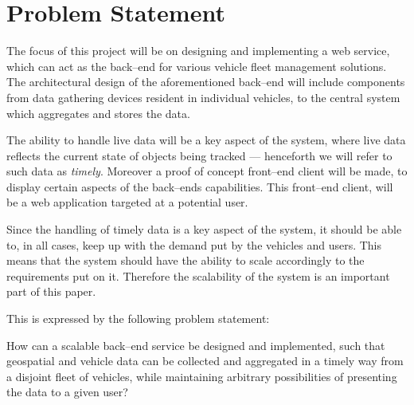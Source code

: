 \section{Problem Statement}\label{sec:problem_statement}

The focus of this project will be on designing and implementing a web service,
which can act as the back--end for various vehicle fleet management solutions.
The architectural design of the aforementioned back--end will include components
from data gathering devices resident in individual vehicles,
to the central system which aggregates and stores the data.

The ability to handle live data will be a key aspect of the system,
where live data reflects the current state of objects being tracked
--- henceforth we will refer to such data as \textit{timely}.
Moreover a proof of concept front--end client will be made,
to display certain aspects of the back--ends capabilities.
This front--end client, will be a web application targeted at a potential user.

Since the handling of timely data is a key aspect of the system,
it should be able to, in all cases, keep up with the demand put by the vehicles and users.
This means that the system should have the ability to scale accordingly to the requirements put on it.
Therefore the scalability of the system is an important part of this paper.

\bigskip\noindent
This is expressed by the following problem statement:

\medskip
{\addtolength{\leftskip}{10mm}\addtolength{\rightskip}{10mm}\noindent\hrulefill\it

\noindent How can a scalable back--end service be designed and implemented,
such that geospatial and vehicle data can be collected and aggregated in a timely way from a disjoint fleet of vehicles,
while maintaining arbitrary possibilities of presenting the data to a given user?

\noindent\hrulefill

}
